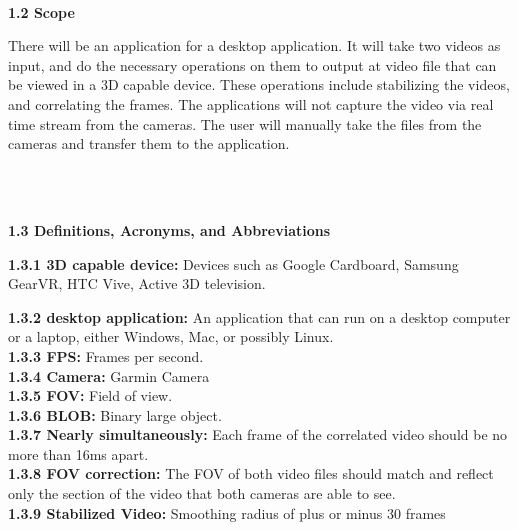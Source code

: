 \documentclass[10pt,draftclsnofoot,onecolumn]{IEEEtran}
\begin{document}
\\
\vspace{5mm}
{\Medium\textbf{1.2 Scope}}\\
\vspace{5mm}

There will be an application for a desktop application. It will take two videos as input, and do the necessary operations on them to output at video file that can be viewed in a 3D capable device. These operations include stabilizing the videos, and correlating the frames. The applications will not capture the video via real time stream from the cameras. The user will manually take the files from the cameras and transfer them to the application. 

 \\

 
 \\ 
\vspace{5mm}

{\Medium\textbf{1.3 Definitions, Acronyms, and Abbreviations}}\\
\vspace{5mm}

\textbf{1.3.1 3D capable device:}   Devices such as Google Cardboard, Samsung GearVR, HTC Vive,  Active 3D television.
 \vspace{5mm}

\textbf{1.3.2 desktop application:}   An application that can run on a desktop computer or a laptop, either Windows, Mac, or possibly Linux.
 \vspace{5mm}\\
\textbf{1.3.3 FPS:}   Frames per second. 
 \vspace{5mm}\\
 \textbf{1.3.4 Camera:}   Garmin Camera
 \vspace{5mm}\\
 \textbf{1.3.5 FOV:}   Field of view. 
 \vspace{5mm}\\
 \textbf{1.3.6 BLOB:}   Binary large object.  
 \vspace{5mm}\\
 \textbf{1.3.7 Nearly simultaneously:}   Each frame of the correlated video should be no more than 16ms apart.
 \vspace{5mm}\\
 \textbf{1.3.8 FOV correction:}   The FOV of both video files should match and reflect only the section of the video that both cameras are able to see. 
 \vspace{5mm}\\
 \textbf{1.3.9 Stabilized Video:}   Smoothing radius of plus or minus 30 frames
\end{document}
